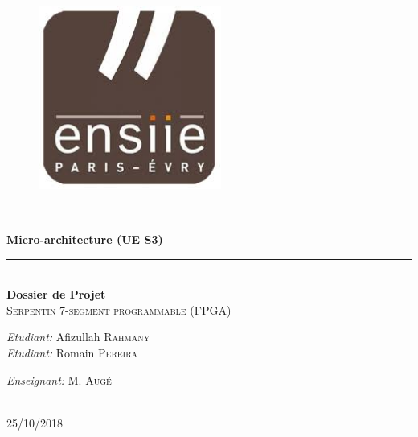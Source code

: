 \documentclass[10pt]{article}
\newcommand{\HRule}{\rule{\linewidth}{0.5mm}}
\begin{document}
    
    \begin{titlepage}
        \begin{sffamily}
            \begin{center}

                \begin{figure}[h!]
                    \includegraphics[width=6cm]{ensiie.jpeg}
                \end{figure}

                \HRule \\[0.8cm]
                { \huge \bfseries Micro-architecture (UE S3) } \\[0.4cm]
                \HRule \\[2.0cm]
                
                { \huge \bfseries Dossier de Projet } \\[0.5cm]

                \textsc{\Large Serpentin 7-segment programmable (FPGA)}\\[2.0cm]

                \vfill
                \begin{minipage}{0.4\textwidth}
                    \begin{flushleft} \large
                        \emph{Etudiant:} Afizullah \textsc{Rahmany}\\
                        \emph{Etudiant:} Romain \textsc{Pereira}\\
                    \end{flushleft}
                \end{minipage}
                \begin{minipage}{0.4\textwidth}
                    \begin{flushright} \large
                        \emph{Enseignant:}  M. \textsc{Augé}
                    \end{flushright}
                \end{minipage}
                \\[2.0cm]
                {\large 25/10/2018}
            \end{center}
        \end{sffamily}
    \end{titlepage}
    
\end{document}

